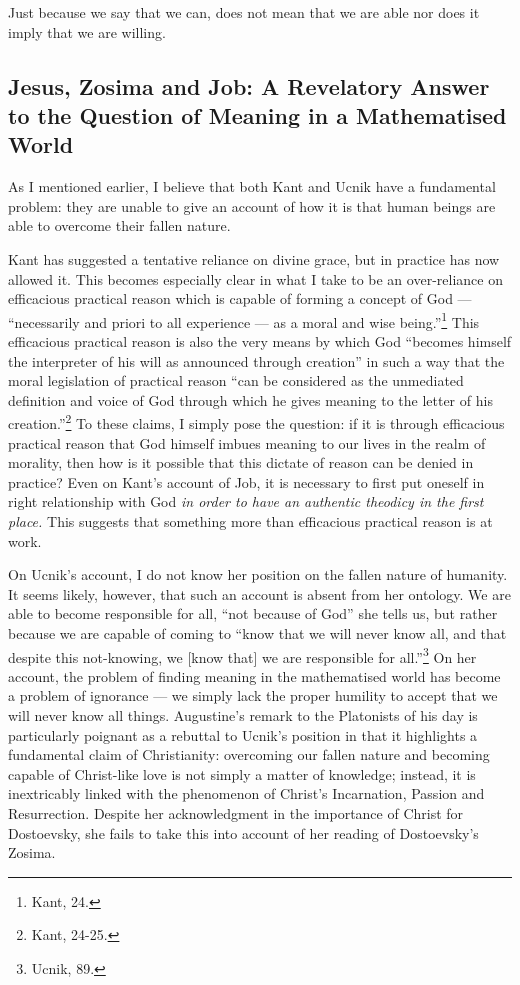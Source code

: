 \documentclass[12pt]{article}
\begin{document}
	Just because we say that we can, does not mean that we are able nor does it imply that we are willing.
	
	\subsection*{Jesus, Zosima and Job: A Revelatory Answer to the Question of Meaning in a Mathematised World}
	
	As I mentioned earlier, I believe that both Kant and Ucnik have a fundamental problem: they are unable to give an account of how it is that human beings are able to overcome their fallen nature. 
	
	Kant has suggested a tentative reliance on divine grace, but in practice has now allowed it. This becomes especially clear in what I take to be an over-reliance on efficacious practical reason which is capable of forming a concept of God --- ``necessarily and priori to all experience --- as a moral and wise being.''\footnote{Kant, 24.} This efficacious practical reason is also the very means by which God ``becomes himself the interpreter of his will as announced through creation'' in such a way that the moral legislation of practical reason ``can be considered as the unmediated definition and voice of God through which he gives meaning to the letter of his creation.''\footnote{Kant, 24-25.} To these claims, I simply pose the question: if it is through efficacious practical reason that God himself imbues meaning to our lives in the realm of morality, then how is it possible that this dictate of reason can be denied in practice? Even on Kant's account of Job, it is necessary to first put oneself in right relationship with God \emph{in order to have an authentic theodicy in the first place.} This suggests that something more than efficacious practical reason is at work.
	
	On Ucnik's account, I do not know her position on the fallen nature of humanity. It seems likely, however, that such an account is absent from her ontology. We are able to become responsible for all, ``not because of God'' she tells us, but rather because we are capable of coming to ``know that we will never know all, and that despite this not-knowing, we [know that] we are responsible for all.''\footnote{Ucnik, 89.} On her account, the problem of finding meaning in the mathematised world has become a problem of ignorance --- we simply lack the proper humility to accept that we will never know all things. Augustine's remark to the Platonists of his day is particularly poignant as a rebuttal to Ucnik's position in that it highlights a fundamental claim of Christianity: overcoming our fallen nature and becoming capable of Christ-like love is not simply a matter of knowledge; instead, it is inextricably linked with the phenomenon of Christ's Incarnation, Passion and Resurrection. Despite her acknowledgment in the importance of Christ for Dostoevsky, she fails to take this into account of her reading of Dostoevsky's Zosima.
	
\end{document}
